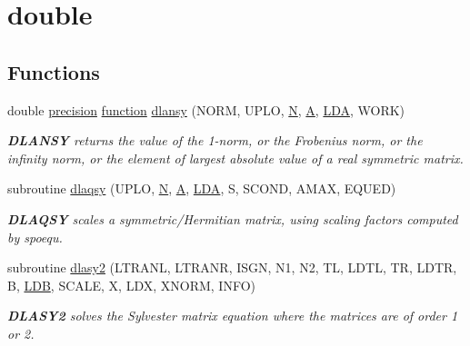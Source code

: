 \hypertarget{group__doubleSYauxiliary}{}\section{double}
\label{group__doubleSYauxiliary}
\subsection*{Functions}
\begin{DoxyCompactItemize}
\item 
double \hyperlink{numinquire_8h_a2c8e616467665d0b2814d4c1589ba74e}{precision} \hyperlink{afunc_8m_a7b5e596df91eadea6c537c0825e894a7}{function} \hyperlink{group__doubleSYauxiliary_ga8e0d957efd6f93764d9bc98a7aa1927a}{dlansy} (N\+O\+R\+M, U\+P\+L\+O, \hyperlink{polmisc_8c_a0240ac851181b84ac374872dc5434ee4}{N}, \hyperlink{classA}{A}, \hyperlink{example__user_8c_ae946da542ce0db94dced19b2ecefd1aa}{L\+D\+A}, W\+O\+R\+K)
\begin{DoxyCompactList}\small\item\em {\bfseries D\+L\+A\+N\+S\+Y} returns the value of the 1-\/norm, or the Frobenius norm, or the infinity norm, or the element of largest absolute value of a real symmetric matrix. \end{DoxyCompactList}\item 
subroutine \hyperlink{group__doubleSYauxiliary_gaf752e7a2738ba60307c9d41d171099b0}{dlaqsy} (U\+P\+L\+O, \hyperlink{polmisc_8c_a0240ac851181b84ac374872dc5434ee4}{N}, \hyperlink{classA}{A}, \hyperlink{example__user_8c_ae946da542ce0db94dced19b2ecefd1aa}{L\+D\+A}, S, S\+C\+O\+N\+D, A\+M\+A\+X, E\+Q\+U\+E\+D)
\begin{DoxyCompactList}\small\item\em {\bfseries D\+L\+A\+Q\+S\+Y} scales a symmetric/\+Hermitian matrix, using scaling factors computed by spoequ. \end{DoxyCompactList}\item 
subroutine \hyperlink{group__doubleSYauxiliary_gaf104dd54134c1a4ddb0d573ff9fe6d06}{dlasy2} (L\+T\+R\+A\+N\+L, L\+T\+R\+A\+N\+R, I\+S\+G\+N, N1, N2, T\+L, L\+D\+T\+L, T\+R, L\+D\+T\+R, B, \hyperlink{example__user_8c_a50e90a7104df172b5a89a06c47fcca04}{L\+D\+B}, S\+C\+A\+L\+E, X, L\+D\+X, X\+N\+O\+R\+M, I\+N\+F\+O)
\begin{DoxyCompactList}\small\item\em {\bfseries D\+L\+A\+S\+Y2} solves the Sylvester matrix equation where the matrices are of order 1 or 2. \end{DoxyCompactList}\item 

\end{DoxyCompactItemize}

